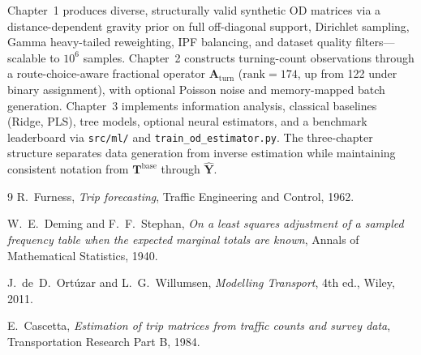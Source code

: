 \documentclass[11pt,a4paper]{report}
\newcommand{\Tbase}{\mathbf{T}^{\mathrm{base}}}
\newcommand{\mathbfY}{\mathbf{Y}}
\newcommand{\Aturn}{\mathbf{A}_{\mathrm{turn}}}
\begin{document}
Chapter~1 produces diverse, structurally valid synthetic OD matrices via a distance-dependent gravity prior on full off-diagonal support, Dirichlet sampling, Gamma heavy-tailed reweighting, IPF balancing, and dataset quality filters---scalable to $10^6$ samples. Chapter~2 constructs turning-count observations through a route-choice-aware fractional operator $\Aturn$ ($\mathrm{rank}=174$, up from 122 under binary assignment), with optional Poisson noise and memory-mapped batch generation. Chapter~3 implements information analysis, classical baselines (Ridge, PLS), tree models, optional neural estimators, and a benchmark leaderboard via \texttt{src/ml/} and \texttt{train\_od\_estimator.py}. The three-chapter structure separates data generation from inverse estimation while maintaining consistent notation from $\Tbase$ through $\hat{\mathbfY}$.

\begin{thebibliography}{9}
R.~Furness, \emph{Trip forecasting}, Traffic Engineering and Control, 1962.

W.~E.~Deming and F.~F.~Stephan,
\emph{On a least squares adjustment of a sampled frequency table when the expected marginal totals are known},
Annals of Mathematical Statistics, 1940.

J.~de~D.~Ort\'{u}zar and L.~G.~Willumsen,
\emph{Modelling Transport}, 4th ed., Wiley, 2011.

E.~Cascetta,
\emph{Estimation of trip matrices from traffic counts and survey data},
Transportation Research Part B, 1984.
\end{thebibliography}
\end{document}
